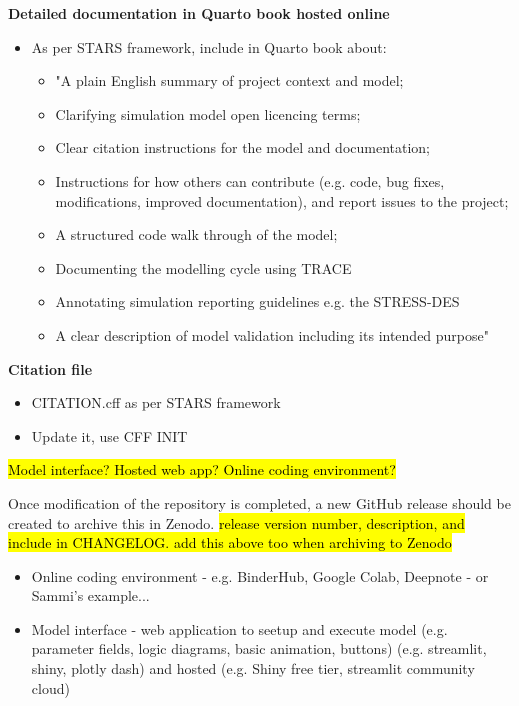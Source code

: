 \textbf{Detailed documentation in Quarto book hosted online}
\begin{itemize}
    \item As per STARS framework, include in Quarto book about:
    \begin{itemize}
            \item "A plain English summary of project context and model;
            \item Clarifying simulation model open licencing terms;
            \item Clear citation instructions for the model and documentation;
            \item Instructions for how others can contribute (e.g. code, bug fixes, modifications, improved documentation), and report issues to the project;
            \item A structured code walk through of the model;
            \item Documenting the modelling cycle using TRACE\autocite{ayllon_keeping_2021}
            \item Annotating simulation reporting guidelines  e.g. the STRESS-DES
            \item A clear description of model validation including its intended purpose"
        \end{itemize}
\end{itemize}

\textbf{Citation file}
\begin{itemize}
    \item CITATION.cff as per STARS framework
    \item Update it, use CFF INIT
\end{itemize}

\hl{Model interface? Hosted web app? Online coding environment?}

Once modification of the repository is completed, a new GitHub release should be created to archive this in Zenodo. \hl{release version number, description, and include in CHANGELOG. add this above too when archiving to Zenodo}
\begin{itemize}
    \item Online coding environment - e.g. BinderHub, Google Colab, Deepnote - or Sammi's example...
    \item Model interface - web application to seetup and execute model (e.g. parameter fields, logic diagrams, basic animation, buttons) (e.g. streamlit, shiny, plotly dash) and hosted (e.g. Shiny free tier, streamlit community cloud)
\end{itemize}


